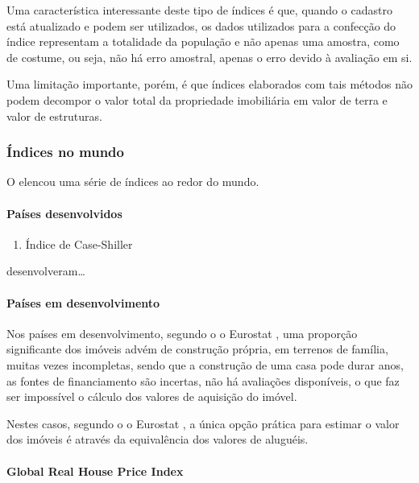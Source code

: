 \documentclass[
	12pt,				%
	oneside,			%
	a4paper,			%
	chapter=TITLE,		%
	section=TITLE,		%
	english,			%
	brazil				%
	]{abntex2}
\begin{document}
Uma característica interessante deste tipo de índices é que, quando o
cadastro está atualizado e podem ser utilizados, os dados utilizados
para a confecção do índice representam a totalidade da população e não
apenas uma amostra, como de costume, ou seja, não há erro amostral,
apenas o erro devido à avaliação em si.

Uma limitação importante, porém, é que índices elaborados com tais
métodos não podem decompor o valor total da propriedade imobiliária em
valor de terra e valor de estruturas.

\subsubsection{Índices no mundo}\label{uxedndices-no-mundo}

O \textcite{rppi} elencou uma série de índices ao redor do mundo.

\paragraph{Países desenvolvidos}\label{pauxedses-desenvolvidos}
\begin{enumerate}
\def\labelenumi{\alph{enumi}.}
\tightlist
\item
  Índice de Case-Shiller
\end{enumerate}
\textcite{NBERw2506} desenvolveram\ldots{}

\paragraph{Países em
desenvolvimento}\label{pauxedses-em-desenvolvimento}

Nos países em desenvolvimento, segundo o o Eurostat
\autocite*[110]{rppi}, uma proporção significante dos imóveis advém de
construção própria, em terrenos de família, muitas vezes incompletas,
sendo que a construção de uma casa pode durar anos, as fontes de
financiamento são incertas, não há avaliações disponíveis, o que faz ser
impossível o cálculo dos valores de aquisição do imóvel.

Nestes casos, segundo o o Eurostat \autocite*[110]{rppi}, a única opção
prática para estimar o valor dos imóveis é através da equivalência dos
valores de aluguéis.

\paragraph{Global Real House Price
Index}\label{global-real-house-price-index}
\end{document}
